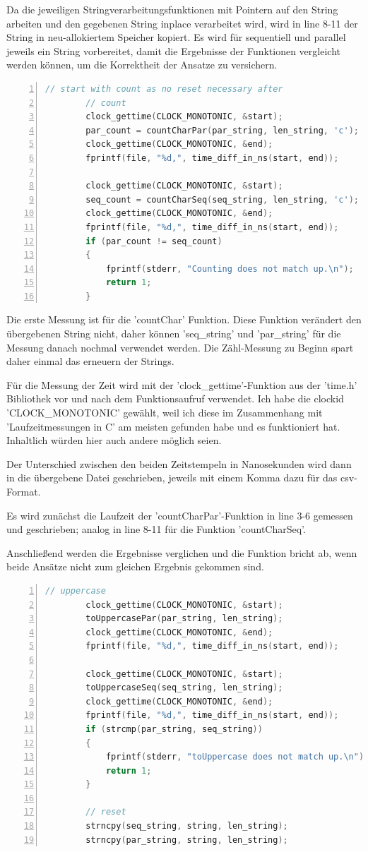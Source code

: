\documentclass[plainarticle,zihtitle,german,final,hyperref,utf8]{zihpub}
\begin{document}
Da die jeweiligen Stringverarbeitungsfunktionen mit Pointern auf den String arbeiten und den gegebenen String inplace verarbeitet wird, wird in line 8-11 der String in neu-allokiertem Speicher kopiert.
Es wird für se­quen­ti­ell und parallel jeweils ein String vorbereitet, damit die Ergebnisse der Funktionen vergleicht werden können, um die Korrektheit der Ansatze zu versichern.

\begin{lstlisting}[language=c, numbers=left]		
		// start with count as no reset necessary after
		// count
		clock_gettime(CLOCK_MONOTONIC, &start);	
		par_count = countCharPar(par_string, len_string, 'c');
		clock_gettime(CLOCK_MONOTONIC, &end);
		fprintf(file, "%d,", time_diff_in_ns(start, end));	
		
		clock_gettime(CLOCK_MONOTONIC, &start);	
		seq_count = countCharSeq(seq_string, len_string, 'c');
		clock_gettime(CLOCK_MONOTONIC, &end);
		fprintf(file, "%d,", time_diff_in_ns(start, end));	
		if (par_count != seq_count)
		{
			fprintf(stderr, "Counting does not match up.\n");
			return 1;
		}
\end{lstlisting}

Die erste Messung ist für die 'countChar' Funktion. Diese Funktion verändert den übergebenen String nicht, daher können 'seq\_string' und 'par\_string' für die Messung danach nochmal verwendet werden. Die Zähl-Messung zu Beginn spart daher einmal das erneuern der Strings.

Für die Messung der Zeit wird mit der 'clock\_gettime'-Funktion aus der 'time.h' Bibliothek vor und nach dem Funktionsaufruf verwendet. Ich habe die clockid 'CLOCK\_MONOTONIC' gewählt, weil ich diese im Zusammenhang mit 'Laufzeitmessungen in C' am meisten gefunden habe und es funktioniert hat. Inhaltlich würden hier auch andere möglich seien.

Der Unterschied zwischen den beiden Zeitstempeln in Nanosekunden wird dann in die übergebene Datei geschrieben, jeweils mit einem Komma dazu für das csv-Format.

Es wird zunächst die Laufzeit der 'countCharPar'-Funktion in line 3-6 gemessen und geschrieben; analog in line 8-11 für die Funktion 'countCharSeq'.

Anschließend werden die Ergebnisse verglichen und die Funktion bricht ab, wenn beide Ansätze nicht zum gleichen Ergebnis gekommen sind.
		
\begin{lstlisting}[language=c, numbers=left]		
		// uppercase
		clock_gettime(CLOCK_MONOTONIC, &start);	
		toUppercasePar(par_string, len_string);
		clock_gettime(CLOCK_MONOTONIC, &end);
		fprintf(file, "%d,", time_diff_in_ns(start, end));	
		
		clock_gettime(CLOCK_MONOTONIC, &start);	
		toUppercaseSeq(seq_string, len_string);
		clock_gettime(CLOCK_MONOTONIC, &end);
		fprintf(file, "%d,", time_diff_in_ns(start, end));	
		if (strcmp(par_string, seq_string))
		{
			fprintf(stderr, "toUppercase does not match up.\n");
			return 1;
		}
		
		// reset
		strncpy(seq_string, string, len_string);
		strncpy(par_string, string, len_string);
\end{lstlisting}		
\end{document}
